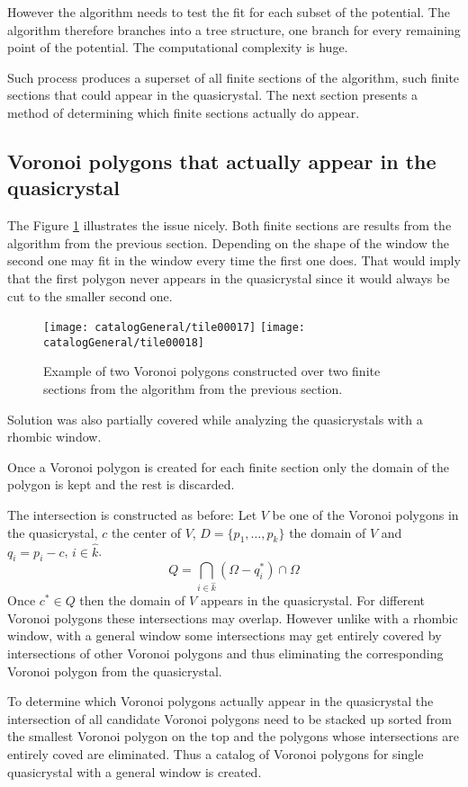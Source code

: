 \documentclass[text.tex]{subfiles}
\begin{document}
However the algorithm needs to test the fit for each subset of the potential. The algorithm therefore branches into a tree structure, one branch for every remaining point of the potential. The computational complexity is huge. 

Such process produces a superset of all finite sections of the algorithm, such finite sections that could appear in the quasicrystal. The next section presents a method of determining which finite sections actually do appear. 

\subsection{Voronoi polygons that actually appear in the quasicrystal}
The Figure \ref{fig:twoTiles} illustrates the issue nicely. Both finite sections are results from the algorithm from the previous section. Depending on the shape of the window the second one may fit in the window every time the first one does. That would imply that the first polygon never appears in the quasicrystal since it would always be cut to the smaller second one. 
\begin{figure}[h!]
\centering
\texttt{[image: catalogGeneral/tile00017]}%
\qquad%
\texttt{[image: catalogGeneral/tile00018]}
\caption{Example of two Voronoi polygons constructed over two finite sections from the algorithm from the previous section.}
\label{fig:twoTiles}
\end{figure}

Solution was also partially covered while analyzing the quasicrystals with a rhombic window. 

Once a Voronoi polygon is created for each finite section only the domain of the polygon is kept and the rest is discarded. 

The intersection is constructed as before:
Let $V$ be one of the Voronoi polygons in the quasicrystal, $c$ the center of $V$, $D = \{p_1,\dots,p_k\}$ the domain of $V$ and $q_i = p_i - c$, $i\in\hat{k}$.
$$Q = \bigcap\limits_{i\in\hat{k}}(\Omega-q_i^\ast)\cap\Omega$$
Once $c^\ast\in Q$ then the domain of $V$ appears in the quasicrystal. For different Voronoi polygons these intersections may overlap. However unlike with a rhombic window, with a general window some intersections may get entirely covered by intersections of other Voronoi polygons and thus eliminating the corresponding Voronoi polygon from the quasicrystal. 

To determine which Voronoi polygons actually appear in the quasicrystal the intersection of all candidate Voronoi polygons need to be stacked up sorted from the smallest Voronoi polygon on the top and the polygons whose intersections are entirely coved are eliminated. Thus a catalog of Voronoi polygons for single quasicrystal with a general window is created. 
\end{document}

